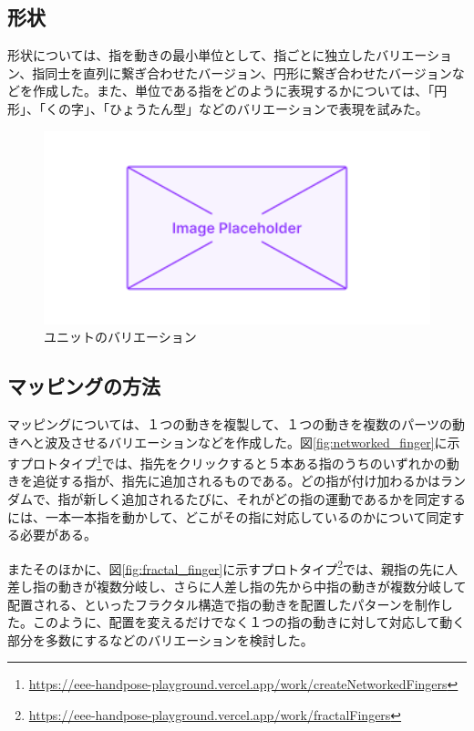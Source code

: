 \subsection*{形状}
形状については、指を動きの最小単位として、指ごとに独立したバリエーション、指同士を直列に繋ぎ合わせたバージョン、円形に繋ぎ合わせたバージョンなどを作成した。また、単位である指をどのように表現するかについては、「円形」、「くの字」、「ひょうたん型」などのバリエーションで表現を試みた。
\begin{figure}[H]
  \centering
  \includegraphics[width=15cm]{img/placeholder.png}
  \caption{ユニットのバリエーション}
  \label{fig:unit_valiation}
\end{figure}
\subsection*{マッピングの方法}
マッピングについては、１つの動きを複製して、１つの動きを複数のパーツの動きへと波及させるバリエーションなどを作成した。図\ref{fig:networked_finger}に示すプロトタイプ\footnote{\url{https://eee-handpose-playground.vercel.app/work/createNetworkedFingers}}では、指先をクリックすると５本ある指のうちのいずれかの動きを追従する指が、指先に追加されるものである。どの指が付け加わるかはランダムで、指が新しく追加されるたびに、それがどの指の運動であるかを同定するには、一本一本指を動かして、どこがその指に対応しているのかについて同定する必要がある。

またそのほかに、図\ref{fig:fractal_finger}に示すプロトタイプ\footnote{\url{https://eee-handpose-playground.vercel.app/work/fractalFingers}}では、親指の先に人差し指の動きが複数分岐し、さらに人差し指の先から中指の動きが複数分岐して配置される、といったフラクタル構造で指の動きを配置したパターンを制作した。このように、配置を変えるだけでなく１つの指の動きに対して対応して動く部分を多数にするなどのバリエーションを検討した。

